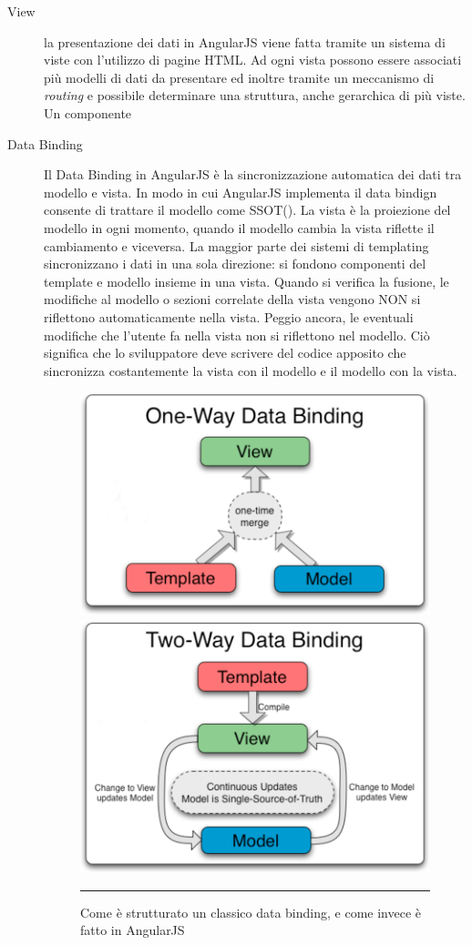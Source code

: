\begin{description}

\item[View] la presentazione dei dati in AngularJS viene fatta tramite un sistema di viste con l'utilizzo di pagine HTML. Ad ogni vista possono essere associati più modelli di dati da presentare ed inoltre tramite un meccanismo di \emph{routing} e possibile determinare una struttura, anche gerarchica di più viste. Un componente 



\item[Data Binding] Il Data Binding in AngularJS è la sincronizzazione automatica dei dati tra modello e vista. In modo in cui AngularJS implementa il data bindign consente di trattare il modello come SSOT(\cite{wiki:SSOT}). La vista è la proiezione del modello in ogni momento, quando il modello cambia la vista riflette il cambiamento e viceversa. 
La maggior parte dei sistemi di templating sincronizzano i dati in una sola direzione: si fondono componenti del template e modello insieme in una vista. Quando si verifica la fusione, le modifiche al modello o sezioni correlate della vista vengono NON si riflettono automaticamente nella vista. Peggio ancora, le eventuali modifiche che l'utente fa nella vista non si riflettono nel modello. Ciò significa che lo sviluppatore deve scrivere del codice apposito che sincronizza costantemente la vista con il modello e il modello con la vista.

\begin{figure}[htbp]
  \centering
    \includegraphics[scale=0.5]{Figures/one-way-data-binding.png} 
    \includegraphics[scale=0.5]{Figures/two-way-data-binding.png} 
    \rule{35em}{0.5pt}
  \caption[Data Bindings]{Come è strutturato un classico data binding, e come invece è fatto in AngularJS}
  \label{fig:Data Binding}
\end{figure}


\end{description}
